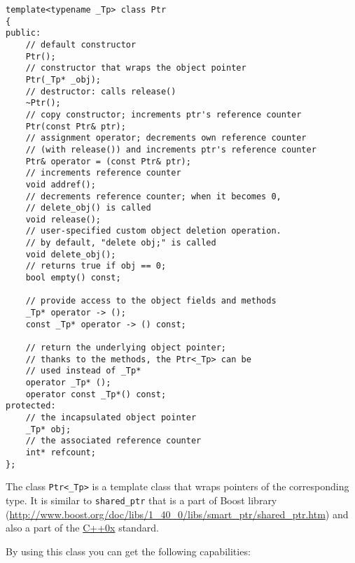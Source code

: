 \begin{lstlisting}
template<typename _Tp> class Ptr
{
public:
    // default constructor
    Ptr();
    // constructor that wraps the object pointer
    Ptr(_Tp* _obj);
    // destructor: calls release()
    ~Ptr();
    // copy constructor; increments ptr's reference counter
    Ptr(const Ptr& ptr);
    // assignment operator; decrements own reference counter
    // (with release()) and increments ptr's reference counter 
    Ptr& operator = (const Ptr& ptr);
    // increments reference counter
    void addref();
    // decrements reference counter; when it becomes 0,
    // delete_obj() is called
    void release();
    // user-specified custom object deletion operation.
    // by default, "delete obj;" is called
    void delete_obj();
    // returns true if obj == 0;
    bool empty() const;

    // provide access to the object fields and methods
    _Tp* operator -> ();
    const _Tp* operator -> () const;

    // return the underlying object pointer;
    // thanks to the methods, the Ptr<_Tp> can be
    // used instead of _Tp*
    operator _Tp* ();
    operator const _Tp*() const;
protected:
    // the incapsulated object pointer
    _Tp* obj;
    // the associated reference counter
    int* refcount;
};
\end{lstlisting}

The class \texttt{Ptr<\_Tp>} is a template class that wraps pointers of the corresponding type. It is similar to \texttt{shared\_ptr} that is a part of Boost library (\url{http://www.boost.org/doc/libs/1_40_0/libs/smart_ptr/shared_ptr.htm}) and also a part of the
\href{http://en.wikipedia.org/wiki/C++0x}{C++0x} standard. 

By using this class you can get the following capabilities:

